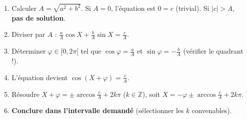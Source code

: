 \documentclass[11pt]{article}
\begin{document}
\begin{methode}[Résolution de $a\cos X+b\sin X=c$ (Méthode harmonique)]
\begin{enumerate}
  \item Calculer $A=\sqrt{a^2+b^2}$. Si $A=0$, l'équation est $0=c$ (trivial). Si $|c|>A$, \textbf{pas de solution}.
  \item Diviser par $A$ : $\frac{a}{A}\cos X+\frac{b}{A}\sin X=\frac{c}{A}$.
  \item Déterminer $\varphi\in[0,2\pi[$ tel que $\cos\varphi=\frac{a}{A}$ et $\sin\varphi=-\frac{b}{A}$ (vérifier le quadrant !).
  \item L'équation devient $\cos(X+\varphi)=\frac{c}{A}$.
  \item Résoudre $X+\varphi=\pm\arccos\frac{c}{A}+2k\pi$ ($k\in\mathbb{Z}$), soit $X=-\varphi\pm\arccos\frac{c}{A}+2k\pi$.
  \item \textbf{Conclure dans l'intervalle demandé} (sélectionner les $k$ convenables).
\end{enumerate}
\end{methode}
\end{document}
